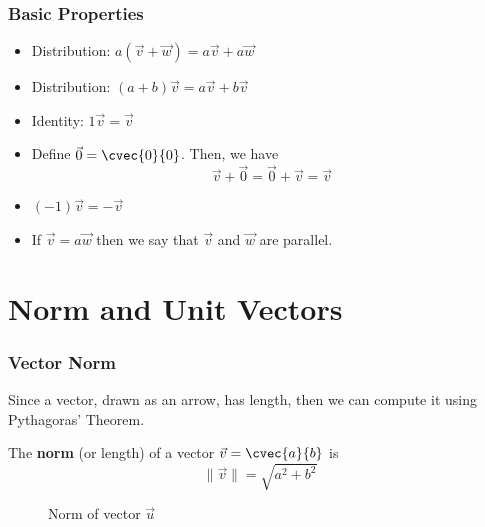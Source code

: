 \begin{frame}
\frametitle{Basic Properties}
\begin{prop}{}{}
\begin{itemize}
\item Distribution: $a (\vec{v} + \vec{w}) = a\vec{v} + a\vec{w}$
\item Distribution: $(a+b)\vec{v} = a\vec{v} + b\vec{v}$
\item Identity: $1\vec{v} = \vec{v}$
\item Define $\vec{0} = \cvec{0}{0}$. Then, we have 
\[\vec{v} + \vec{0} = \vec{0} + \vec{v} = \vec{v}\]
\item $(-1)\vec{v} = -\vec{v}$
\item If $\vec{v} = a \vec{w}$ then we say that $\vec{v}$ and $\vec{w}$ are parallel.
\end{itemize}
\end{prop}
\end{frame}

\section[Norm and Unit] {Norm and Unit Vectors}
\frame{\sectionpage}

\begin{frame}
\frametitle{Vector Norm}
Since a vector, drawn as an arrow, has length, then we can compute it using Pythagoras' Theorem.
\begin{defn}{}{}
The \textbf{norm} (or length) of a vector $\vec{v} = \cvec{a}{b}$ is 
\begin{equation}
\| \vec{v} \| = \sqrt{a^2+b^2}
\end{equation}
\end{defn}
\end{frame}

\begin{frame}
\begin{figure}[h!]
\centering
{}
\caption{Norm of vector $\vec{u}$}
\end{figure}
\end{frame}



